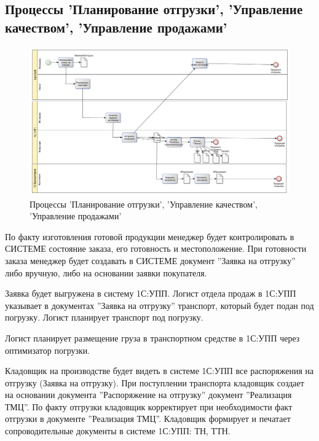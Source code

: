 \subsection{Процессы 'Планирование отгрузки', 'Управление качеством', 'Управление продажами'}
%
\begin{figure}
\begin{center}
  \includegraphics[angle=90, height=0.9\textheight, keepaspectratio]{Pics/5_Отгрузка.pdf}
\end{center}
  \caption{Процессы 'Планирование отгрузки', 'Управление качеством', 'Управление продажами'}
  \label{pic:Schema_5}
\end{figure}





По факту изготовления готовой продукции менеджер будет контролировать в СИСТЕМЕ состояние заказа, его готовность и местоположение.
При готовности заказа менеджер будет создавать в СИСТЕМЕ документ ''Заявка на отгрузку'' либо вручную, либо на основании заявки покупателя.

Заявка будет выгружена в систему 1С:УПП.
Логист отдела продаж в 1С:УПП указывает в документах ''Заявка на отгрузку'' транспорт, который будет подан под погрузку. Логист планирует транспорт под погрузку.

Логист планирует размещение груза в транспортном средстве в 1С:УПП через оптимизатор погрузки.


Кладовщик на производстве будет видеть в системе 1С:УПП все распоряжения на отгрузку (Заявка на отгрузку).
При поступлении транспорта кладовщик создает на основании документа ''Распоряжение на отгрузку'' документ ''Реализация ТМЦ''. По факту отгрузки кладовщик корректирует при необходимости факт отгрузки в документе ''Реализация ТМЦ''. 
Кладовщик формирует и печатает сопроводительные документы в системе 1С:УПП: ТН, ТТН.


